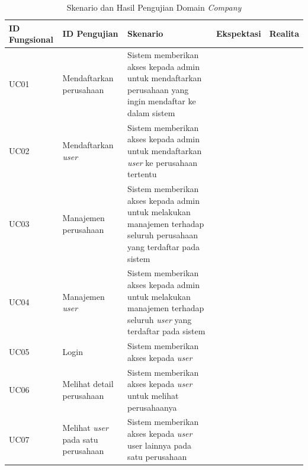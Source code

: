 \bgroup
\begin{table}[ht]
  \def\arraystretch{1.7}
  \caption{Skenario dan Hasil Pengujian Domain \textit{Company}}
  \label{tab:pengujian-domain-company}
  \centering
  \begin{tabular}{|p{2cm}|p{2cm}|p{3cm}|p{3cm}|p{2cm}|}
    \hline
    ID Fungsional & ID Pengujian                               & Skenario                                                                                                                                   & Ekspektasi & Realita \\
    \hline
    UC01          & Mendaftarkan perusahaan                    & Sistem memberikan akses kepada admin untuk mendaftarkan perusahaan yang ingin mendaftar ke dalam sistem                                                           \\
    \hline
    UC02          & Mendaftarkan \textit{user}                 & Sistem memberikan akses kepada admin untuk mendaftarkan \textit{user} ke perusahaan tertentu                                                                      \\
    \hline
    UC03          & Manajemen perusahaan                       & Sistem memberikan akses kepada admin untuk melakukan manajemen terhadap seluruh perusahaan yang terdaftar pada sistem                                             \\
    \hline
    UC04          & Manajemen \textit{user}                    & Sistem memberikan akses kepada admin untuk melakukan manajemen terhadap seluruh \textit{user} yang terdaftar pada sistem                                          \\
    \hline
    UC05          & Login                                      & Sistem memberikan akses kepada \textit{user}                                                                                                                      \\
    \hline
    UC06          & Melihat detail perusahaan                  & Sistem memberikan akses kepada \textit{user} untuk melihat perusahaanya                                                                                           \\
    \hline
    UC07          & Melihat \textit{user} pada satu perusahaan & Sistem memberikan akses kepada \textit{user} user lainnya pada satu perusahaan                                                                                    \\


\end{tabular}
\end{table}
